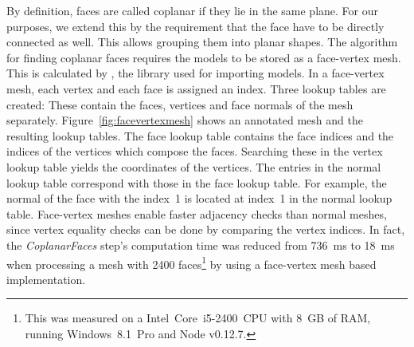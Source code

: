 \documentclass[../ClassicThesis.tex]{subfiles}
\begin{document}
By definition, faces are called coplanar if they lie in the same plane. For our purposes, we extend this by the requirement that the face have to be directly connected as well. This allows grouping them into planar shapes. The algorithm for finding coplanar faces requires the models to be stored as a face-vertex mesh. This is calculated by {\meshlib}, the library used for importing models. In a face-vertex mesh, each vertex and each face is assigned an index. Three lookup tables are created: These contain the faces, vertices and face normals of the mesh separately. Figure~\ref{fig:facevertexmesh} shows an annotated mesh and the resulting lookup tables. The face lookup table contains the face indices and the indices of the vertices which compose the faces. Searching these in the vertex lookup table yields the coordinates of the vertices. The entries in the normal lookup table correspond with those in the face lookup table. For example, the normal of the face with the index~1 is located at index~1 in the normal lookup table. Face-vertex meshes enable faster adjacency checks than normal meshes, since vertex equality checks can be done by comparing the vertex indices. In fact, the \emph{CoplanarFaces} step's computation time was reduced from 736~ms to 18~ms when processing a mesh with 2400 faces\footnote{This was measured on a Intel{\textregistered}~Core{\texttrademark}~i5-2400~CPU with 8~GB of RAM, running Windows~8.1~Pro and Node v0.12.7.} by using a face-vertex mesh based implementation.
\end{document}
